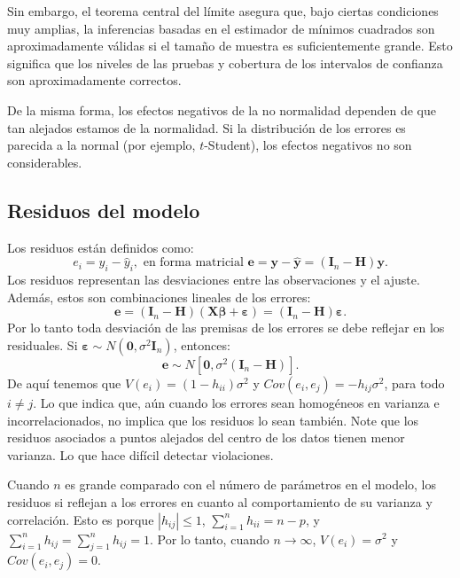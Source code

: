 \documentclass[
]{article}
\begin{document}
Sin embargo, el teorema central del límite asegura que, bajo ciertas condiciones muy amplias, la inferencias basadas en el estimador de mínimos cuadrados son aproximadamente válidas si el tamaño de muestra es suficientemente grande. Esto significa que los niveles de las pruebas y cobertura de los intervalos de confianza son aproximadamente correctos.

De la misma forma, los efectos negativos de la no normalidad dependen de que tan alejados estamos de la normalidad. Si la distribución de los errores es parecida a la normal (por ejemplo, \(t\)-Student), los efectos negativos no son considerables.

\hypertarget{residuos-del-modelo}{%
\subsection{Residuos del modelo}\label{residuos-del-modelo}}

Los residuos están definidos como:
\[
e_{i} = y_{i}- \widehat{y}_{i}, \mbox{ en forma matricial }\boldsymbol e= \boldsymbol y- \widehat{\boldsymbol y}= (\boldsymbol I_{n} - \boldsymbol H)\boldsymbol y.
\]
Los residuos representan las desviaciones entre las observaciones y el ajuste. Además, estos son combinaciones lineales de los errores:
\[
\boldsymbol e= (\boldsymbol I_{n} - \boldsymbol H)(\boldsymbol X\boldsymbol \beta+\boldsymbol \varepsilon) = (\boldsymbol I_{n} - \boldsymbol H)\boldsymbol \varepsilon.
\]
Por lo tanto toda desviación de las premisas de los errores se debe reflejar en los residuales. Si \(\boldsymbol \varepsilon\sim N(\boldsymbol 0,\sigma^{2}\boldsymbol I_{n})\), entonces:
\[
\boldsymbol e\sim N \left[ \boldsymbol 0, \sigma^{2}(\boldsymbol I_{n} - \boldsymbol H)  \right].
\]
De aquí tenemos que \(V(e_{i}) = (1-h_{ii})\sigma^{2}\) y \(Cov(e_{i},e_{j}) = - h_{ij}\sigma^{2}\), para todo \(i \neq j\). Lo que indica que, aún cuando los errores sean homogéneos en varianza e incorrelacionados, no implica que los residuos lo sean también. Note que los residuos asociados a puntos alejados del centro de los datos tienen menor varianza. Lo que hace difícil detectar violaciones.

Cuando \(n\) es grande comparado con el número de parámetros en el modelo, los residuos si reflejan a los errores en cuanto al comportamiento de su varianza y correlación. Esto es porque \(|h_{ij}| \leq 1\), \(\sum_{i=1}^{n}h_{ii} = n-p\), y \(\sum_{i=1}^{n}h_{ij}=\sum_{j=1}^{n}h_{ij}=1\). Por lo tanto, cuando \(n\rightarrow \infty\), \(V(e_{i}) = \sigma^{2}\) y \(Cov(e_{i},e_{j}) = 0\).
\end{document}
